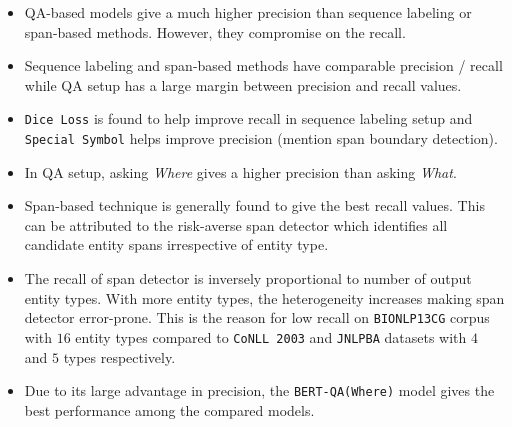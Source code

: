 \begin{itemize}
    \item QA-based models give a much higher precision than sequence labeling or span-based methods. However, they compromise on the recall.
    
    \item Sequence labeling and span-based methods have comparable precision / recall while QA setup has a large margin between precision and recall values.
    
    \item \texttt{Dice Loss} is found to help improve recall in sequence labeling setup and \texttt{Special Symbol} helps improve precision (mention span boundary detection).
    
    \item In QA setup, asking \textit{Where} gives a higher precision than asking \textit{What}.
    
    \item Span-based technique is generally found to give the best recall values. This can be attributed to the risk-averse span detector which identifies all candidate entity spans irrespective of entity type.
    
    \item The recall of span detector is inversely proportional to number of output entity types. With more entity types, the heterogeneity increases making span detector error-prone. This is the reason for low recall on \texttt{BIONLP13CG} corpus with $16$ entity types compared to \texttt{CoNLL 2003} and \texttt{JNLPBA} datasets with $4$ and $5$ types respectively.
    
    \item Due to its large advantage in precision, the \texttt{BERT-QA(Where)} model gives the best performance among the compared models.
\end{itemize}

